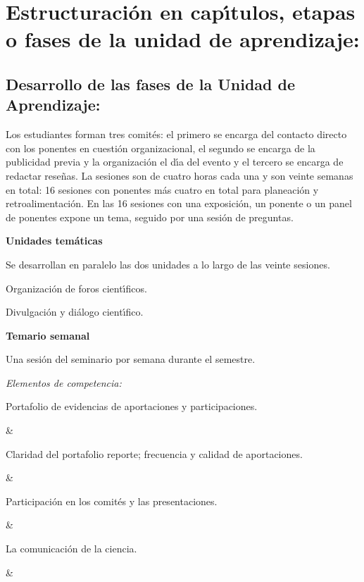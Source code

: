 \section{Estructuraci\'{o}n en cap\'{\i}tulos, etapas o fases de la unidad de
  aprendizaje:}

\subsection{Desarrollo de las fases de la Unidad de Aprendizaje:}

Los estudiantes forman tres comit\'{e}s: el primero se encarga del
contacto directo con los ponentes en cuesti\'{o}n organizacional, el
segundo se encarga de la publicidad previa y la organizaci\'{o}n el
d\'{\i}a del evento y el tercero se encarga de redactar rese\~{n}as.
La sesiones son de cuatro horas cada una y son veinte semanas en
total: 16 sesiones con ponentes m\'{a}s cuatro en total para
planeaci\'{o}n y retroalimentaci\'{o}n. En las 16 sesiones con una
exposici\'{o}n, un ponente o un panel de ponentes expone un tema,
seguido por una sesi\'{o}n de preguntas.

{\bf Unidades tem\'{a}ticas}

Se desarrollan en paralelo las dos unidades a lo largo de las veinte
sesiones.

\begin{description}[itemsep=-2pt]
\item[U1]{Organizaci\'{o}n de foros cient\'{\i}ficos.}
\item[U2]{Divulgaci\'{o}n y di\'{a}logo cient\'{\i}fico.}
\end{description}

{\bf Temario semanal}

Una sesi\'{o}n del seminario por semana durante el semestre.


{\em Elementos de competencia:}



Portafolio de evidencias de aportaciones y participaciones.

&

Claridad del portafolio reporte; frecuencia y calidad de aportaciones.

&

Participaci\'{o}n en los comit\'{e}s y las presentaciones.

&

La comunicaci\'{o}n de la ciencia.

&

